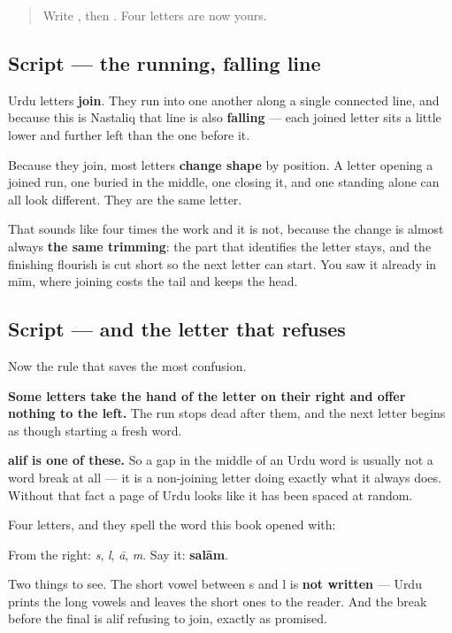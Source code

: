 \label{lesson:UR-W04-joining}



\begin{quote}
Write , then . Four letters are now yours.
\end{quote}

\subsection*{Script — the running, falling line}
Urdu letters \textbf{join}. They run into one another along a single connected line, and because this is Nastaliq that line is also \textbf{falling} — each joined letter sits a little lower and further left than the one before it.

Because they join, most letters \textbf{change shape} by position. A letter opening a joined run, one buried in the middle, one closing it, and one standing alone can all look different. They are the same letter.

That sounds like four times the work and it is not, because the change is almost always \textbf{the same trimming}: the part that identifies the letter stays, and the finishing flourish is cut short so the next letter can start. You saw it already in mīm, where joining costs the tail and keeps the head.

\subsection*{Script — and the letter that refuses}
Now the rule that saves the most confusion.

\textbf{Some letters take the hand of the letter on their right and offer nothing to the left.} The run stops dead after them, and the next letter begins as though starting a fresh word.

\textbf{alif is one of these.} So a gap in the middle of an Urdu word is usually not a word break at all — it is a non-joining letter doing exactly what it always does. Without that fact a page of Urdu looks like it has been spaced at random.

\begin{grammarlens}[title={What you've built}]
Four letters, and they spell the word this book opened with:

\begin{quote}
\end{quote}

From the right: \textbf{} \emph{s}, \textbf{} \emph{l}, \textbf{} \emph{ā}, \textbf{} \emph{m}. Say it: \textbf{salām}.

Two things to see. The short vowel between s and l is \textbf{not written} — Urdu prints the long vowels and leaves the short ones to the reader. And the break before the final  is alif refusing to join, exactly as promised.
\end{grammarlens}

